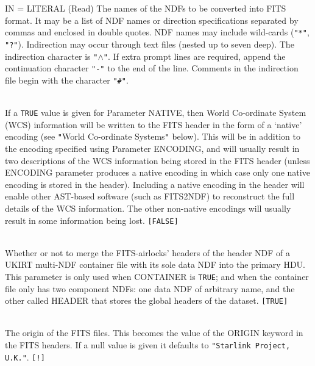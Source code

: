 \documentclass[twoside,11pt]{article}
\newcommand{\htmlref}[2]{#1}
\newcommand{\xref}[3]{#1}
\newcommand{\dqt}[1]{{\texttt{"#1"}}}
\newcommand{\hash}{\dqt{\#}}
\newcommand{\hash}{\dqt{#}}
\newcommand{\sstsubsection}[1]{ \item[{#1}] \mbox{} \\}
\newcommand{\sstsubsection}[1]{\item[{#1}]}
\begin{document}
{{{         IN = LITERAL (Read)
      }{
         The names of the NDFs to be converted into FITS format.  It
         may be a list of NDF names or direction specifications
         separated by commas and enclosed in double quotes.  
         NDF names may include wild-cards (\texttt{"*"}, \texttt{"?"}).
         Indirection may occur through text files (nested up to seven
         deep).  The indirection character is \texttt{"$\wedge$"}.  If extra
         prompt lines are required, append the continuation character
         \texttt{"-"} to the end of the line.
         Comments in the indirection file begin with the character \hash.
      }
      \sstsubsection{
         NATIVE = \_LOGICAL (Read)
      }{
         If a \texttt{TRUE} value is given for Parameter NATIVE, then World
         Co-ordinate System (WCS) information will be written to the
         FITS header in the form of a `native' encoding (see 
         \htmlref{\texttt{"}World Co-ordinate Systems\texttt{"}}
         {world_coordinate_systems} below).  This will be in addition to the
         encoding specified using Parameter ENCODING, and will usually result
         in  two descriptions of the WCS information being stored in the FITS 
         header (unless ENCODING parameter produces a native encoding in which
         case only one native encoding is stored in the header). Including a
         native encoding in the header will enable other 
         \xref{AST}{sun210}{abstract}-based software 
         (such as 
         \htmlref{FITS2NDF}{FITS2NDF}) 
         to reconstruct the full details of the WCS information. 
         The other non-native encodings will usually result in some 
         information being lost. \texttt{[FALSE]}
      }
      \sstsubsection{
         MERGE = \_LOGICAL (Read)
      }{
         Whether or not to merge the FITS-airlocks' headers of the 
         header NDF of a UKIRT multi-NDF container file with its sole 
         data NDF into the primary HDU.  This parameter is only used
         when CONTAINER is \texttt{TRUE}; and when the container file only has
         two component NDFs: one data NDF of arbitrary name, and the
         other called HEADER that stores the global headers of the
         dataset. \texttt{[TRUE]}
      }
      \sstsubsection{
         ORIGIN = LITERAL (Read)
      }{
         The origin of the FITS files.  This becomes the value of the
         ORIGIN keyword in the FITS headers.  If a null value is given
         it defaults to \texttt{"Starlink Project, U.K."}.
         \texttt{[!]}
      }
      \sstsubsection{
         OUT = LITERAL (Write)
}}}
\end{document}

